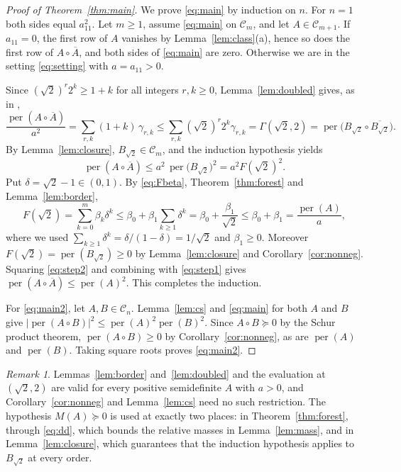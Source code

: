 \documentclass[11pt]{amsart}
\theoremstyle{remark}
\newtheorem{remark}[theorem]{Remark}
\numberwithin{equation}{section}
\newcommand{\per}{\operatorname{per}}
\newcommand{\cC}{\mathcal{C}}
\newcommand{\conj}[1]{\overline{#1}}
\begin{document}
\begin{proof}[Proof of Theorem~\ref{thm:main}]
We prove \eqref{eq:main} by induction on $n$. For $n=1$ both sides equal $a_{11}^2$. Let $m\ge1$, assume \eqref{eq:main} on $\cC_m$, and let $A\in\cC_{m+1}$. If $a_{11}=0$, the first row of $A$ vanishes by Lemma~\ref{lem:class}(a), hence so does the first row of $A\circ\conj{A}$, and both sides of \eqref{eq:main} are zero. Otherwise we are in the setting \eqref{eq:setting} with $a=a_{11}>0$.

Since $(\sqrt2)^r2^k\ge1+k$ for all integers $r,k\ge0$, Lemma~\ref{lem:doubled} gives, as in \cite[Proposition~4.1]{LZL},
\[
\frac{\per(A\circ\conj{A})}{a^2}=\sum_{r,k}(1+k)\,\gamma_{r,k}\le\sum_{r,k}(\sqrt2)^r2^k\gamma_{r,k}=\Gamma(\sqrt2,2)=\per\bigl(B_{\sqrt2}\circ\conj{B_{\sqrt2}}\bigr).
\]
By Lemma~\ref{lem:closure}, $B_{\sqrt2}\in\cC_m$, and the induction hypothesis yields
\begin{equation}\label{eq:step1}
\per(A\circ\conj{A})\le a^2\,\per\bigl(B_{\sqrt2}\bigr)^2=a^2F(\sqrt2)^2 .
\end{equation}
Put $\delta=\sqrt2-1\in(0,1)$. By \eqref{eq:Fbeta}, Theorem~\ref{thm:forest} and Lemma~\ref{lem:border},
\begin{equation}\label{eq:step2}
F(\sqrt2)=\sum_{k=0}^m\beta_k\delta^k\le\beta_0+\beta_1\sum_{k\ge1}\delta^k=\beta_0+\frac{\beta_1}{\sqrt2}\le\beta_0+\beta_1=\frac{\per(A)}{a},
\end{equation}
where we used $\sum_{k\ge1}\delta^k=\delta/(1-\delta)=1/\sqrt2$ and $\beta_1\ge0$. Moreover $F(\sqrt2)=\per(B_{\sqrt2})\ge0$ by Lemma~\ref{lem:closure} and Corollary~\ref{cor:nonneg}. Squaring \eqref{eq:step2} and combining with \eqref{eq:step1} gives $\per(A\circ\conj{A})\le\per(A)^2$. This completes the induction.

For \eqref{eq:main2}, let $A,B\in\cC_n$. Lemma~\ref{lem:cs} and \eqref{eq:main} for both $A$ and $B$ give $|\per(A\circ B)|^2\le\per(A)^2\per(B)^2$. Since $A\circ B\succeq0$ by the Schur product theorem, $\per(A\circ B)\ge0$ by Corollary~\ref{cor:nonneg}, as are $\per(A)$ and $\per(B)$. Taking square roots proves \eqref{eq:main2}.
\end{proof}

\begin{remark}\label{rem:where}
Lemmas~\ref{lem:border} and~\ref{lem:doubled} and the evaluation at $(\sqrt2,2)$ are valid for every positive semidefinite $A$ with $a>0$, and Corollary~\ref{cor:nonneg} and Lemma~\ref{lem:cs} need no such restriction. The hypothesis $M(A)\succeq0$ is used at exactly two places: in Theorem~\ref{thm:forest}, through \eqref{eq:dd}, which bounds the relative masses in Lemma~\ref{lem:mass}, and in Lemma~\ref{lem:closure}, which guarantees that the induction hypothesis applies to $B_{\sqrt2}$ at every order.
\end{remark}
\end{document}
